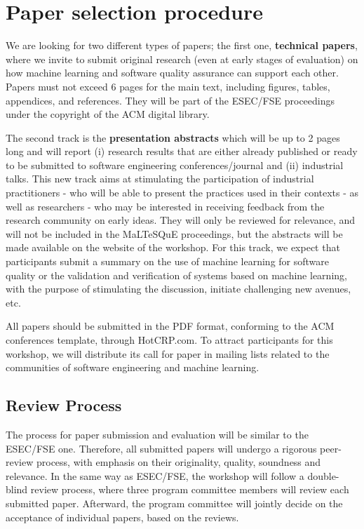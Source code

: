 
\section{Paper selection procedure}
\label{sec:submissions}

We are looking for two different types of papers; the first one, \ie \textbf{technical papers}, where we invite to submit original research (even at early stages of evaluation) on how machine learning and software quality assurance can support each other.
Papers must not exceed 6 pages for the main text, including figures, tables, appendices, and references.
They will be part of the ESEC/FSE proceedings under the copyright of the ACM digital library.

The second track is the \ie \textbf{presentation abstracts} which will be up to 2 pages long and will report (i) research results that are either already published or ready to be submitted to software engineering conferences/journal and (ii) industrial talks. This new track aims at stimulating the participation of industrial practitioners - who will be able to present the practices used in their contexts - as well as researchers - who may be interested in receiving feedback from the research community on early ideas. They will only be reviewed for relevance, and will not be included in the MaLTeSQuE proceedings, but the abstracts will be made available on the website of the workshop.
For this track, we expect that participants submit a summary on the use of machine learning for software quality or the validation and verification of systems based on machine learning, with the purpose of stimulating the discussion, initiate challenging new avenues, etc.

All papers should be submitted in the PDF format, conforming to the ACM conferences template, through HotCRP.com.
To attract participants for this workshop, we will distribute its call for paper in mailing lists related to the communities of software engineering and machine learning.

\subsection{Review Process}

The process for paper submission and evaluation will be similar to the ESEC/FSE one.
Therefore, all submitted papers will undergo a rigorous peer-review process, with emphasis on their originality, quality, soundness and relevance.
In the same way as ESEC/FSE, the workshop will follow a double-blind review process, where three program committee members will review each submitted paper.
Afterward, the program committee will jointly decide on the acceptance of individual papers, based on the reviews.

